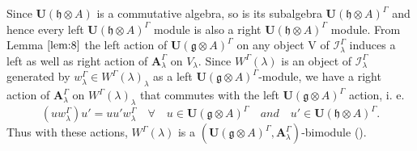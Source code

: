 \documentclass[11pt]{amsart}
\theoremstyle{plain}
\theoremstyle{definition}
\newcommand{\g}{\mathfrak{g}}
\newcommand{\h}{\mathfrak{h}}
\begin{document}
Since $\mathbf{U}(\h\otimes A)$ is a commutative algebra, so is its subalgebra $\mathbf{U}(\h\otimes A)^{\Gamma}$ and hence every left $\mathbf{U}(\h\otimes A)^{\Gamma}$ module is also a right $\mathbf{U}(\h\otimes A)^{\Gamma}$ module. From Lemma $\ref{lem:8}$ the left action of $\mathbf{U}(\g\otimes A)^{\Gamma}$ on any object V of $\mathcal{I}_{\lambda}^{\Gamma}$ induces a left as well as right action of $\mathbf{A}_{\lambda}^{\Gamma}$ on $V_{\lambda}$. Since $W^{\Gamma}(\lambda)$ is an object of $\mathcal{I}_{\lambda}^{\Gamma}$ generated by $w_{\lambda}^{\Gamma}\in W^{\Gamma}(\lambda)_{\lambda}$ as a left $\mathbf{U}(\g\otimes A)^{\Gamma}$-module, we have a right action of $\mathbf{A}_{\lambda}^{\Gamma}$ on $W^{\Gamma}(\lambda)_{\lambda}$ that commutes with the left $\mathbf{U}(\g\otimes A)^{\Gamma}$ action, i. e.  
\begin{equation*}
    (uw_{\lambda}^{\Gamma})u'=uu'w_{\lambda}^{\Gamma} \quad \forall \quad u\in\mathbf{U}(\g\otimes A)^{\Gamma}\quad and \quad u'\in\mathbf{U}(\h\otimes A)^{\Gamma} .
\end{equation*}
Thus with these actions, $W^\Gamma(\lambda)$ is a $(\mathbf{U}(\g\otimes A)^{\Gamma},\mathbf{A}_{\lambda}^{\Gamma})$-bimodule (\cite{FMS15}).
\end{document}
